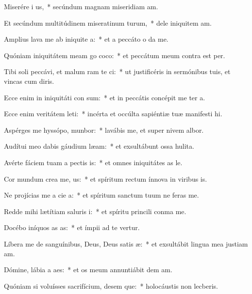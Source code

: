 \item Miserére i us,~* secúndum magnam miseridiam am.
\item Et secúndum multitúdinem miseratinum turum,~* dele iniquitem am.
\item Amplius lava me ab iniquite a:~* et a peccáto o da me.
\item Quóniam iniquitátem meam go coco:~* et peccátum meum contra  est per.
\item Tibi soli peccávi, et malum ram te ci:~* ut justificéris in sermónibus tuis, et vincas cum diris.
\item Ecce enim in iniquitáti con sum:~* et in peccátis concépit me ter a.
\item Ecce enim veritátem leti:~* incérta et occúlta sapiéntiæ tuæ manifesti hi.
\item Aspérges me hyssópo,  munbor:~* lavábis me, et super nivem albor.
\item Audítui meo dabis gáudium  læam:~* et exsultábunt ossa hulita.
\item Avérte fáciem tuam a pectis is:~* et omnes iniquitátes as le.
\item Cor mundum crea  me, us:~* et spíritum rectum ínnova in viribus is.
\item Ne projícias me a cie a:~* et spíritum sanctum tuum ne feras  me.
\item Redde mihi lætítiam saluris i:~* et spíritu princili conma me.
\item Docébo iníquos as as:~* et ímpii ad te vertur.
\item Líbera me de sanguínibus, Deus, Deus satis æ:~* et exsultábit lingua mea justiam am.
\item Dómine, lábia a aes:~* et os meum annuntiábit dem am.
\item Quóniam si voluísses sacrifícium, desem que:~* holocáustis non lecberis.
